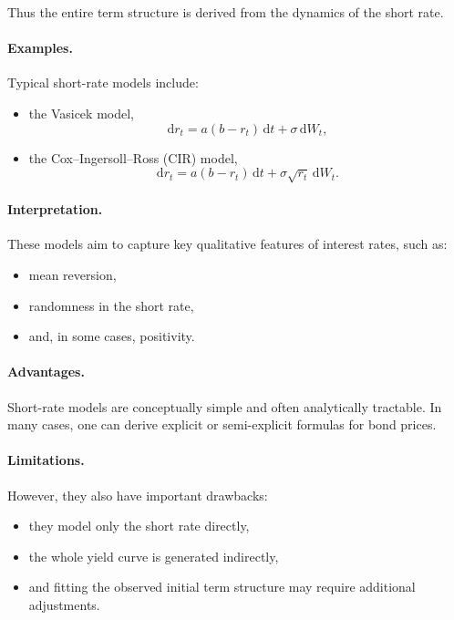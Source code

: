 \documentclass[11pt]{article}
\theoremstyle{plain}
\theoremstyle{definition}
\theoremstyle{remark}
\begin{document}
Thus the entire term structure is derived from the dynamics of the short
rate.

\paragraph{Examples.}
Typical short-rate models include:
\begin{itemize}[leftmargin=1.4em]
    \item the Vasicek model,
    \[
    \mathrm{d}r_t = a(b-r_t)\,\mathrm{d}t+\sigma\,\mathrm{d}W_t,
    \]
    \item the Cox--Ingersoll--Ross (CIR) model,
    \[
    \mathrm{d}r_t = a(b-r_t)\,\mathrm{d}t+\sigma\sqrt{r_t}\,\mathrm{d}W_t.
    \]
\end{itemize}

\paragraph{Interpretation.}
These models aim to capture key qualitative features of interest rates,
such as:
\begin{itemize}[leftmargin=1.4em]
    \item mean reversion,
    \item randomness in the short rate,
    \item and, in some cases, positivity.
\end{itemize}

\paragraph{Advantages.}
Short-rate models are conceptually simple and often analytically
tractable.
In many cases, one can derive explicit or semi-explicit formulas for
bond prices.

\paragraph{Limitations.}
However, they also have important drawbacks:
\begin{itemize}[leftmargin=1.4em]
    \item they model only the short rate directly,
    \item the whole yield curve is generated indirectly,
    \item and fitting the observed initial term structure may require
    additional adjustments.
\end{itemize}
\end{document}
